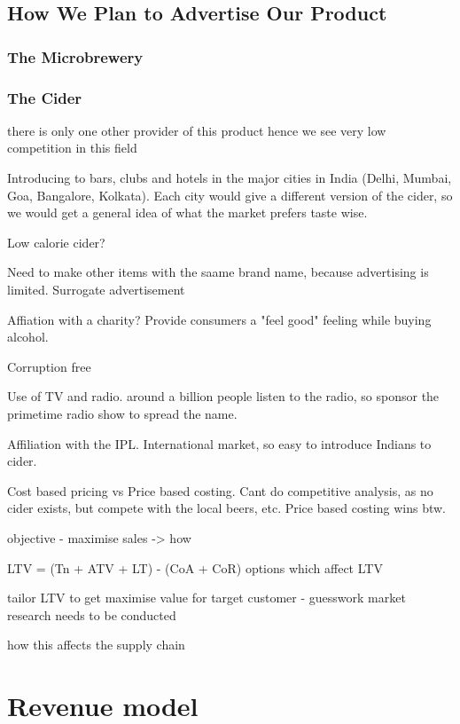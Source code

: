\documentclass{article}
\begin{document}
\subsection{How We Plan to Advertise Our Product}
\subsubsection{The Microbrewery}
\subsubsection{The Cider}
\newpage

there is only one other provider of this product hence we see very low competition in this field 

Introducing to bars, clubs and hotels in the major cities in India (Delhi, Mumbai, Goa,
Bangalore, Kolkata). Each city would give a different version of the cider, so we would
get a general idea of what the market prefers taste wise.

Low calorie cider?

Need to make other items with the saame brand name, because advertising is limited. Surrogate advertisement

Affiation with a charity? Provide consumers a "feel good" feeling while buying alcohol.

Corruption free

Use of TV and radio. around a billion people listen to the radio, so sponsor the primetime radio
show to spread the name.

Affiliation with the IPL. International market, so easy to introduce Indians to cider.

Cost based pricing vs Price based costing. Cant do competitive analysis, as no cider exists, but compete with
the local beers, etc. Price based costing wins btw.



objective - maximise sales -> how

LTV = (Tn + ATV + LT) - (CoA + CoR) 
options which affect LTV

tailor LTV to get maximise value for target customer - guesswork market research
needs to be conducted

how this affects the supply chain
\newpage
\section{Revenue model}
\newpage
\end{document}

